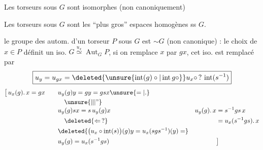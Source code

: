 
Les torseurs sous $G$ sont isomorphes (non canoniquement)

Les torseurs sous $G$ sont les ``plus gros'' espaces homogènes ss $G$.

le groupe des autom. d'un torseur $P$ sous $G$ est $\sim G$ (non canonique) : le choix de $x\in P$ définit un iso. $G\overset{u_x}{\simeq}\operatorname{Aut}_{G}P$, si on remplace $x$ par $gx$, cet iso. est remplacé par
\[
\boxed{u_y=u_{gx}=\deleted{\unsure{\operatorname{int}(g)\circ|\operatorname{int}g\circ}}u_x\circ\,?\,\operatorname{int}(s^{-1})}
\]
{\small
\[
\begin{aligned}
\bigl[\,u_x(g).\,x=gx\qquad &u_y(g)y=gy=gsx\unsure{=|\mathord{.}} &&\\
&\quad\unsure{\Vert|\text{''}} &&\\[-3pt]
&u_y(g)sx=s\,u_y(g)x\qquad &u_y(g).\,x&=s^{-1}gs\,x\\
&\quad\deleted{\Leftarrow\,?} &&=u_x(s^{-1}gs).\,x\\
&\deleted{\bigl(u_x\circ\operatorname{int}(s)\bigr)(g)y=u_x(sgs^{-1})(y)=} &&\\
&u_y(g)=u_x(s^{-1}gs) &&\bigr]
\end{aligned}
\]}
